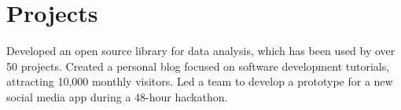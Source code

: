 \section{Projects}
  \resumeSubHeadingListStart
      {Developed an open source library for data analysis, which has been used by over 50 projects.}
      {Created a personal blog focused on software development tutorials, attracting 10,000 monthly visitors.}
      {Led a team to develop a prototype for a new social media app during a 48-hour hackathon.}
  \resumeSubHeadingListEnd